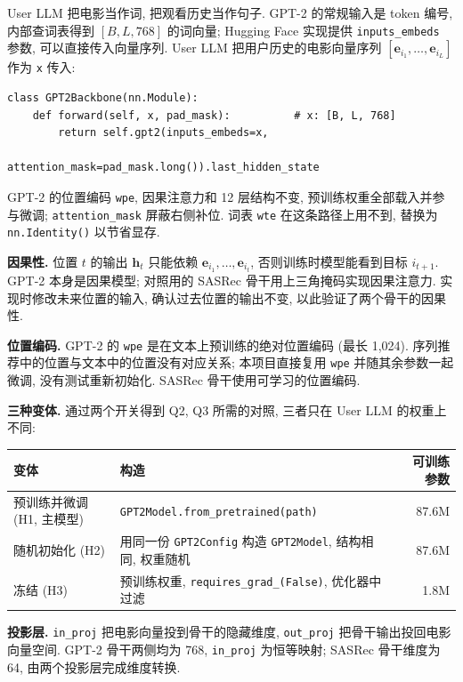 \documentclass{article}
\begin{document}
User LLM 把电影当作词, 把观看历史当作句子. GPT-2 的常规输入是 token 编号, 内部查词表得到 $[B, L, 768]$ 的词向量; Hugging Face 实现提供 \texttt{inputs\_embeds} 参数, 可以直接传入向量序列. User LLM 把用户历史的电影向量序列 $[\mathbf{e}_{i_1},\ldots,\mathbf{e}_{i_L}]$ 作为 \texttt{x} 传入:
\begin{footnotesize}
\begin{verbatim}
class GPT2Backbone(nn.Module):
    def forward(self, x, pad_mask):          # x: [B, L, 768]
        return self.gpt2(inputs_embeds=x,
                         attention_mask=pad_mask.long()).last_hidden_state
\end{verbatim}
\end{footnotesize}
GPT-2 的位置编码 \texttt{wpe}, 因果注意力和 12 层结构不变, 预训练权重全部载入并参与微调; \texttt{attention\_mask} 屏蔽右侧补位. 词表 \texttt{wte} 在这条路径上用不到, 替换为 \texttt{nn.Identity()} 以节省显存.

\textbf{因果性.} 位置 $t$ 的输出 $\mathbf{h}_t$ 只能依赖 $\mathbf{e}_{i_1},\ldots,\mathbf{e}_{i_t}$, 否则训练时模型能看到目标 $i_{t+1}$. GPT-2 本身是因果模型; 对照用的 SASRec 骨干用上三角掩码实现因果注意力. 实现时修改未来位置的输入, 确认过去位置的输出不变, 以此验证了两个骨干的因果性.

\textbf{位置编码.} GPT-2 的 \texttt{wpe} 是在文本上预训练的绝对位置编码 (最长 1,024). 序列推荐中的位置与文本中的位置没有对应关系; 本项目直接复用 \texttt{wpe} 并随其余参数一起微调, 没有测试重新初始化. SASRec 骨干使用可学习的位置编码.

\textbf{三种变体.} 通过两个开关得到 Q2, Q3 所需的对照, 三者只在 User LLM 的权重上不同:

\begin{center}
\small
\begin{tabularx}{\textwidth}{lXr}
\toprule
变体 & 构造 & 可训练参数 \\
\midrule
预训练并微调 (H1, 主模型) & \texttt{GPT2Model.from\_pretrained(path)} & 87.6M \\
随机初始化 (H2) & 用同一份 \texttt{GPT2Config} 构造 \texttt{GPT2Model}, 结构相同, 权重随机 & 87.6M \\
冻结 (H3) & 预训练权重, \texttt{requires\_grad\_(False)}, 优化器中过滤 & 1.8M \\
\bottomrule
\end{tabularx}
\end{center}

\textbf{投影层.} \texttt{in\_proj} 把电影向量投到骨干的隐藏维度, \texttt{out\_proj} 把骨干输出投回电影向量空间. GPT-2 骨干两侧均为 768, \texttt{in\_proj} 为恒等映射; SASRec 骨干维度为 64, 由两个投影层完成维度转换.
\end{document}
